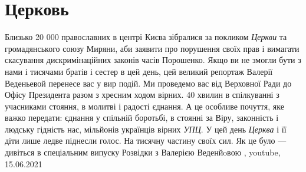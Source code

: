 
 
 
 
 
\chapter{Церковь}

Близько 20 000 православних в центрі Києва зібралися за покликом \emph{Церкви} та
громадянського союзу Миряни, аби заявити про порушення своїх прав і вимагати
скасування дискримінаційних законів часів Порошенко.  Якщо ви не змогли бути з
нами і тисячами братів і сестер в цей день, цей великий репортаж Валерії
Веденьевой перенесе вас у вир подій. Ми проведемо вас від Верховної Ради до
Офісу Президента разом з хресним ходом вірних. 40 хвилин в спілкуванні з
учасниками стояння, в молитві і радості єднання. А це особливе почуття, яке
важко передати: єднання у спільній боротьбі, в стоянні за Віру, законність і
людську гідність нас, мільйонів українців вірних \emph{УПЦ}.  У цей день \emph{Церква} і її
діти лише ледве піднесли голос. На тисячну частину своїх сил.  Як це було —
дивіться в спеціальним випуску Розвідки з Валерією Веденйoвою
,
youtube, 15.06.2021

